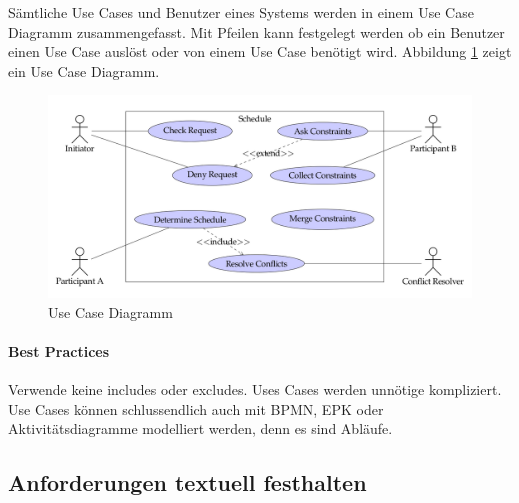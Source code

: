 Sämtliche Use Cases und Benutzer eines Systems werden in einem Use Case Diagramm zusammengefasst. Mit Pfeilen kann festgelegt werden ob ein Benutzer einen Use Case auslöst oder von einem Use Case benötigt wird. Abbildung \ref{fig:use-case-diagramm} zeigt ein Use Case Diagramm.
\begin{figure}
\centering
\includegraphics[width=\linewidth]{fig/use-case-diagramm}
\caption{Use Case Diagramm}
\label{fig:use-case-diagramm}
\end{figure}

\paragraph{Best Practices} Verwende keine includes oder excludes. Uses Cases werden unnötige kompliziert. Use Cases können schlussendlich auch mit BPMN, EPK oder Aktivitätsdiagramme modelliert werden, denn es sind Abläufe.

\subsection{Anforderungen textuell festhalten}

